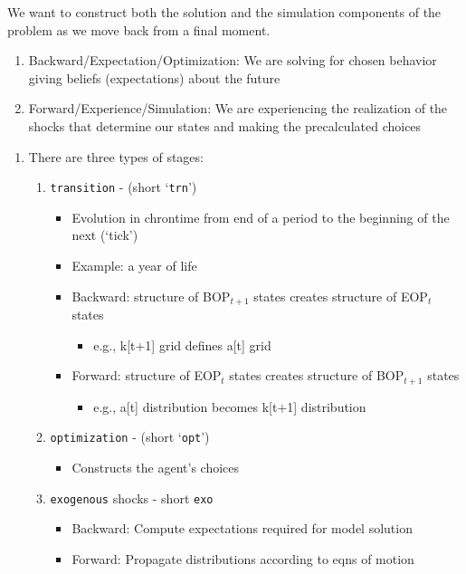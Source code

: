 \documentclass[\econtexRoot/BufferStockTheory]{subfiles}
\begin{document}
We want to construct both the solution and the simulation components of the problem as we move back from a final moment.

\begin{enumerate}
\item Backward/Expectation/Optimization: We are solving for chosen behavior giving beliefs (expectations) about the future
\item Forward/Experience/Simulation: We are experiencing the realization of the shocks that determine our states and making the precalculated choices
\end{enumerate}


\begin{enumerate}
\item There are three types of stages:
  \begin{enumerate}
  \item \texttt{transition} - (short `\texttt{trn}')
    \begin{itemize}
    \item Evolution in chrontime from end of a period to the beginning of the next (`tick')
    \item Example: a year of life
    \item Backward: structure of BOP$_{t+1}$ states creates structure of EOP$_{t}$ states
      \begin{itemize}
      \item e.g., k[t+1] grid defines a[t] grid
      \end{itemize}
    \item Forward: structure of EOP$_{t}$ states creates structure of BOP$_{t+1}$ states
      \begin{itemize}
      \item e.g., a[t] distribution becomes k[t+1] distribution
      \end{itemize}
    \end{itemize}
  \item \texttt{optimization} - (short `\texttt{opt}')
    \begin{itemize}
    \item Constructs the agent's choices
    \end{itemize}
  \item \texttt{exogenous} shocks - short \texttt{exo}
    \begin{itemize}
    \item Backward: Compute expectations required for model solution
    \item Forward: Propagate distributions according to eqns of motion
    \end{itemize}
  \end{enumerate}
\end{enumerate}
\end{document}

